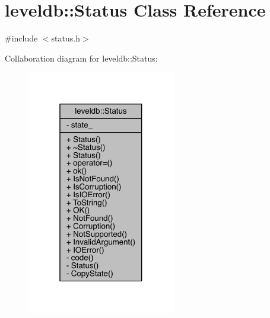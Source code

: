 \hypertarget{classleveldb_1_1_status}{}\section{leveldb\+:\+:Status Class Reference}
\label{classleveldb_1_1_status}


{\ttfamily \#include $<$status.\+h$>$}



Collaboration diagram for leveldb\+:\+:Status\+:\nopagebreak
\begin{figure}[H]
\begin{center}
\leavevmode
\includegraphics[width=184pt]{classleveldb_1_1_status__coll__graph}
\end{center}
\end{figure}
